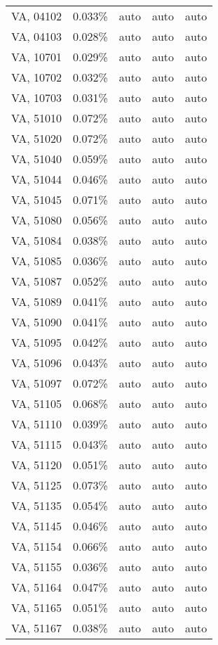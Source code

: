 \begin{longtable}[]{@{}lllll@{}}
VA, 04102 & 0.033\% & auto & auto & auto \\
VA, 04103 & 0.028\% & auto & auto & auto \\
VA, 10701 & 0.029\% & auto & auto & auto \\
VA, 10702 & 0.032\% & auto & auto & auto \\
VA, 10703 & 0.031\% & auto & auto & auto \\
VA, 51010 & 0.072\% & auto & auto & auto \\
VA, 51020 & 0.072\% & auto & auto & auto \\
VA, 51040 & 0.059\% & auto & auto & auto \\
VA, 51044 & 0.046\% & auto & auto & auto \\
VA, 51045 & 0.071\% & auto & auto & auto \\
VA, 51080 & 0.056\% & auto & auto & auto \\
VA, 51084 & 0.038\% & auto & auto & auto \\
VA, 51085 & 0.036\% & auto & auto & auto \\
VA, 51087 & 0.052\% & auto & auto & auto \\
VA, 51089 & 0.041\% & auto & auto & auto \\
VA, 51090 & 0.041\% & auto & auto & auto \\
VA, 51095 & 0.042\% & auto & auto & auto \\
VA, 51096 & 0.043\% & auto & auto & auto \\
VA, 51097 & 0.072\% & auto & auto & auto \\
VA, 51105 & 0.068\% & auto & auto & auto \\
VA, 51110 & 0.039\% & auto & auto & auto \\
VA, 51115 & 0.043\% & auto & auto & auto \\
VA, 51120 & 0.051\% & auto & auto & auto \\
VA, 51125 & 0.073\% & auto & auto & auto \\
VA, 51135 & 0.054\% & auto & auto & auto \\
VA, 51145 & 0.046\% & auto & auto & auto \\
VA, 51154 & 0.066\% & auto & auto & auto \\
VA, 51155 & 0.036\% & auto & auto & auto \\
VA, 51164 & 0.047\% & auto & auto & auto \\
VA, 51165 & 0.051\% & auto & auto & auto \\
VA, 51167 & 0.038\% & auto & auto & auto \\

\end{longtable}
